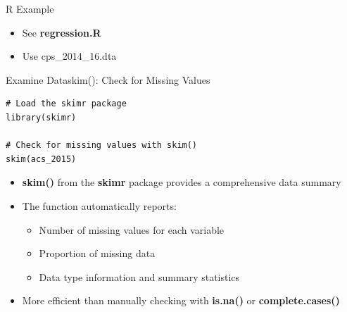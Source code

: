 \documentclass[dvipsnames,hyperref={pdfpagelabels=false}]{beamer}
\begin{document}





\date
{}


\begin{frame}{}
	\titlepage
\end{frame}






\begin{frame}{R Example}{}
	\begin{itemize}
		\item See \textbf{regression.R}
		\vspace{0.2cm}
		\item Use cps\_2014\_16.dta
		\vspace{0.2cm}
		
	\end{itemize}
\end{frame}


\begin{frame}[fragile]{Examine Data}{skim(): Check for Missing Values}
\begin{lstlisting}
# Load the skimr package
library(skimr)

# Check for missing values with skim()
skim(acs_2015)
\end{lstlisting}
		\vspace{0.2cm}
	\begin{itemize}
		\item \textbf{skim()} from the \textbf{skimr} package provides a comprehensive data summary
		\vspace{0.2cm}
		\item The function automatically reports:
		\vspace{0.2cm}
		\begin{itemize}
			\item Number of missing values for each variable
			\vspace{0.2cm}
			\item Proportion of missing data
			\vspace{0.2cm}
			\item Data type information and summary statistics
		\end{itemize}
		\vspace{0.2cm}
		\item More efficient than manually checking with \textbf{is.na()} or \textbf{complete.cases()}
	\end{itemize}
\end{frame}
\end{document}
